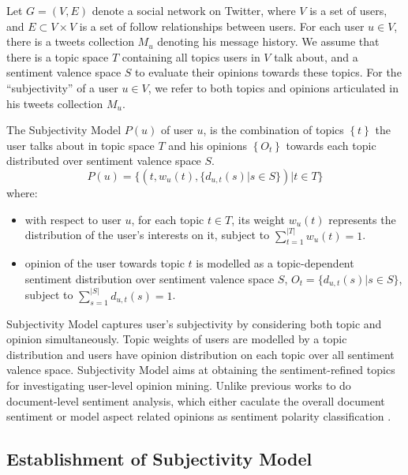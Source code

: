 \documentclass[runningheads,a4paper]{llncs}
\begin{document}
Let $G=\left( V,E \right) $ denote a social network on Twitter, where $ V $ is a set of users, and $ E\subset V\times V $ is a set of follow relationships between users. For each user $ u \in V $, there is a tweets collection $ M_{u} $ denoting his message history. We assume that there is a topic space $ T $ containing all topics users in $ V $ talk about, and a sentiment valence space $ S $ to evaluate their opinions towards these topics. 
For the ``subjectivity'' of a user $ u  \in V $, we refer to both topics and opinions articulated in his tweets collection $ M_{u} $.  
\begin{definition}
The Subjectivity Model $ P \left( u \right) $ of user $ u $, is the combination of topics $\left\lbrace  t \right\rbrace $ the user talks about in topic space $T$ and his opinions $\left\lbrace O_{t}\right\rbrace $ towards each topic distributed over sentiment valence space $ S $. 
\begin{equation}
\label{usermodel}
P \left( u \right) = \lbrace \left( t, w_{u} \left( t \right), \lbrace d_{u,t} \left( s \right)|s \in S \rbrace \right) |  t \in T \rbrace
\end{equation}
where:
\begin{itemize}
\item with respect to user $ u $, for each topic $t \in T$, its weight $ w_{u} \left( t \right)$ represents the distribution of the user's interests on it, subject to $ \sum_{t=1}^{|T|}w_{u} \left( t \right)=1 $.
\item opinion of the user towards topic $t$ is modelled as a topic-dependent sentiment distribution over sentiment valence space $ S $, $O_{t}=\lbrace d_{u,t} \left( s \right)|s \in S \rbrace $, subject to $ \sum_{s=1}^{|S|} d_{u,t} \left( s \right)=1$.
\end{itemize}
\end{definition}

Subjectivity Model captures user’s subjectivity by considering both topic and opinion simultaneously. Topic weights of users are modelled by a topic distribution and users have opinion distribution on each topic over all sentiment valence space. Subjectivity Model aims at obtaining the sentiment-refined topics for investigating user-level opinion mining. Unlike previous works to do document-level sentiment analysis, which either caculate the overall document sentiment or model aspect related opinions as sentiment polarity classification \cite{tan2011user}.

\subsection{Establishment of Subjectivity Model }
\label{establish}
\end{document}
